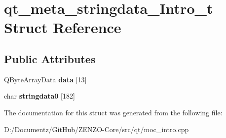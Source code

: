 \hypertarget{structqt__meta__stringdata___intro__t}{}\section{qt\+\_\+meta\+\_\+stringdata\+\_\+\+Intro\+\_\+t Struct Reference}
\label{structqt__meta__stringdata___intro__t}
\subsection*{Public Attributes}
\begin{DoxyCompactItemize}
\item 
\mbox{\label{structqt__meta__stringdata___intro__t_a9ad575660d261e5eb749f2d93f69f034}} 
Q\+Byte\+Array\+Data {\bfseries data} \mbox{[}13\mbox{]}
\item 
\mbox{\label{structqt__meta__stringdata___intro__t_a47ab78d8399c2b8b4aa7f444c6c2d862}} 
char {\bfseries stringdata0} \mbox{[}182\mbox{]}
\end{DoxyCompactItemize}


The documentation for this struct was generated from the following file\+:\begin{DoxyCompactItemize}
\item 
D\+:/\+Documentz/\+Git\+Hub/\+Z\+E\+N\+Z\+O-\/\+Core/src/qt/moc\+\_\+intro.\+cpp\end{DoxyCompactItemize}
